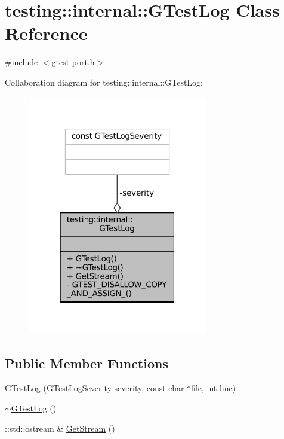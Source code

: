 \hypertarget{classtesting_1_1internal_1_1GTestLog}{}\section{testing\+:\+:internal\+:\+:G\+Test\+Log Class Reference}
\label{classtesting_1_1internal_1_1GTestLog}


{\ttfamily \#include $<$gtest-\/port.\+h$>$}



Collaboration diagram for testing\+:\+:internal\+:\+:G\+Test\+Log\+:
\nopagebreak
\begin{figure}[H]
\begin{center}
\leavevmode
\includegraphics[width=223pt]{classtesting_1_1internal_1_1GTestLog__coll__graph}
\end{center}
\end{figure}
\subsection*{Public Member Functions}
\begin{DoxyCompactItemize}
\item 
\hyperlink{classtesting_1_1internal_1_1GTestLog_a364691bf972983a59cfa2891062a64af}{G\+Test\+Log} (\hyperlink{namespacetesting_1_1internal_aa6255ef3b023c5b4e1a2198d887fb977}{G\+Test\+Log\+Severity} severity, const char $\ast$file, int line)
\item 
\hyperlink{classtesting_1_1internal_1_1GTestLog_a978a099703bbaa0f380216e8d7ee03d3}{$\sim$\+G\+Test\+Log} ()
\item 
\+::std\+::ostream \& \hyperlink{classtesting_1_1internal_1_1GTestLog_aebb92e67d98eca69f0347d5121dab27a}{Get\+Stream} ()
\end{DoxyCompactItemize}
